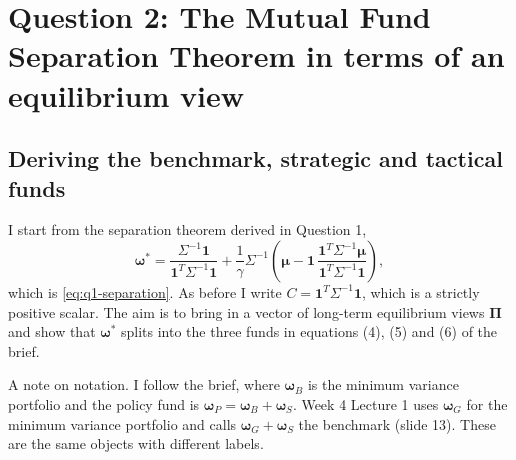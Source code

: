 \documentclass[11pt]{article}
\numberwithin{equation}{section}
\begin{document}
\section*{Question 2: The Mutual Fund Separation Theorem in terms of an equilibrium view}
\setcounter{section}{2}
\setcounter{subsection}{0}
\setcounter{equation}{0}
\label{sec:q2}

\subsection{Deriving the benchmark, strategic and tactical funds}
\label{sec:q2-1}

I start from the separation theorem derived in Question 1,
\begin{equation}
  \bm{\omega}^{*} = \frac{\Sigma^{-1}\mathbf{1}}{\mathbf{1}^{T}\Sigma^{-1}\mathbf{1}} + \frac{1}{\gamma}\Sigma^{-1}\left(\bm{\mu} - \mathbf{1}\,\frac{\mathbf{1}^{T}\Sigma^{-1}\bm{\mu}}{\mathbf{1}^{T}\Sigma^{-1}\mathbf{1}}\right),
  \label{eq:q2-start}
\end{equation}
which is \eqref{eq:q1-separation}. As before I write $C = \mathbf{1}^{T}\Sigma^{-1}\mathbf{1}$, which is a strictly positive scalar. The aim is to bring in a vector of long-term equilibrium views $\bm{\Pi}$ and show that $\bm{\omega}^{*}$ splits into the three funds in equations (4), (5) and (6) of the brief.

A note on notation. I follow the brief, where $\bm{\omega}_{B}$ is the minimum variance portfolio and the policy fund is $\bm{\omega}_{P} = \bm{\omega}_{B} + \bm{\omega}_{S}$. Week 4 Lecture 1 uses $\bm{\omega}_{G}$ for the minimum variance portfolio and calls $\bm{\omega}_{G} + \bm{\omega}_{S}$ the benchmark (slide 13). These are the same objects with different labels.
\end{document}
